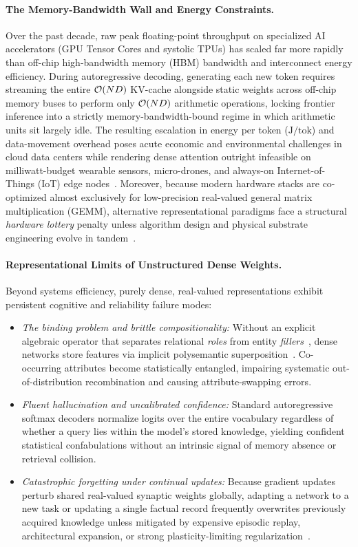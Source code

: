 \paragraph{The Memory-Bandwidth Wall and Energy Constraints.}
Over the past decade, raw peak floating-point throughput on specialized AI accelerators (GPU Tensor Cores and systolic TPUs) has scaled far more rapidly than off-chip high-bandwidth memory (HBM) bandwidth and interconnect energy efficiency.
During autoregressive decoding, generating each new token requires streaming the entire $\mathcal{O}\!\left(ND\right)$ KV-cache alongside static weights across off-chip memory buses to perform only $\mathcal{O}\!\left(ND\right)$ arithmetic operations, locking frontier inference into a strictly memory-bandwidth-bound regime in which arithmetic units sit largely idle.
The resulting escalation in energy per token ($\mathrm{J/tok}$) and data-movement overhead poses acute economic and environmental challenges in cloud data centers while rendering dense attention outright infeasible on milliwatt-budget wearable sensors, micro-drones, and always-on Internet-of-Things (IoT) edge nodes~\cite{RAHIMI_HDC_EDGE}.
Moreover, because modern hardware stacks are co-optimized almost exclusively for low-precision real-valued general matrix multiplication (GEMM), alternative representational paradigms face a structural \emph{hardware lottery} penalty unless algorithm design and physical substrate engineering evolve in tandem~\cite{HOOKER_2021_HARDWARE_LOTTERY}.

\paragraph{Representational Limits of Unstructured Dense Weights.}
Beyond systems efficiency, purely dense, real-valued representations exhibit persistent cognitive and reliability failure modes:
\begin{itemize}
    \item \emph{The binding problem and brittle compositionality:} Without an explicit algebraic operator that separates relational \emph{roles} from entity \emph{fillers}~\cite{SMOLENSKY_1990_TPR}, dense networks store features via implicit polysemantic superposition~\cite{ELHAGE_2022_SUPERPOSITION}. Co-occurring attributes become statistically entangled, impairing systematic out-of-distribution recombination and causing attribute-swapping errors.
    \item \emph{Fluent hallucination and uncalibrated confidence:} Standard autoregressive softmax decoders normalize logits over the entire vocabulary regardless of whether a query lies within the model's stored knowledge, yielding confident statistical confabulations without an intrinsic signal of memory absence or retrieval collision.
    \item \emph{Catastrophic forgetting under continual updates:} Because gradient updates perturb shared real-valued synaptic weights globally, adapting a network to a new task or updating a single factual record frequently overwrites previously acquired knowledge unless mitigated by expensive episodic replay, architectural expansion, or strong plasticity-limiting regularization~\cite{KIRKPATRICK_2017_EWC}.
\end{itemize}

